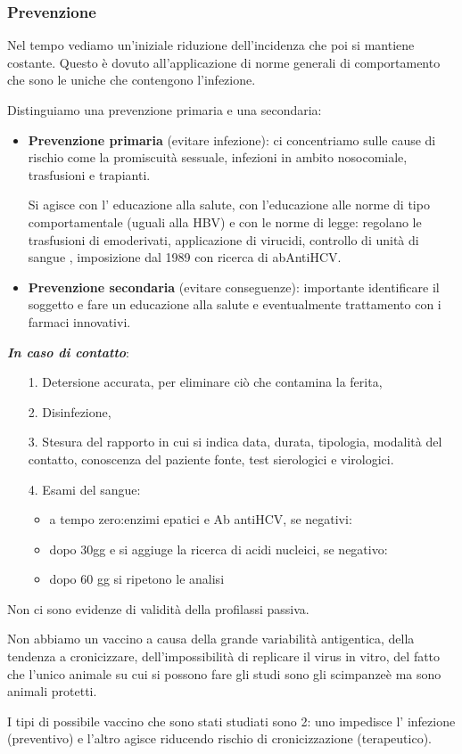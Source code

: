 \subsubsection{Prevenzione}

  Nel tempo vediamo un'iniziale riduzione dell'incidenza che poi si
  mantiene costante. Questo è dovuto all'applicazione di norme generali
  di comportamento che sono le uniche che contengono l'infezione.

  Distinguiamo una prevenzione primaria e una secondaria:

\begin{itemize}
\item
  \textbf{Prevenzione primaria} (evitare infezione): ci concentriamo
  sulle cause di rischio come la promiscuità sessuale, infezioni in
  ambito nosocomiale, trasfusioni e trapianti.

  Si agisce con l' educazione alla salute, con l'educazione alle norme
  di tipo comportamentale (uguali alla HBV) e con le norme di legge:
  regolano le trasfusioni di emoderivati, applicazione di virucidi,
  controllo di unità di sangue , imposizione dal 1989 con ricerca di
  abAntiHCV.
\item
  \textbf{Prevenzione secondaria} (evitare conseguenze): importante
  identificare il soggetto e fare un educazione alla salute e
  eventualmente trattamento con i farmaci innovativi.
\end{itemize}
  
\textbf{\emph{In caso di contatto}}:

\begin{itemize}
\item[1.]
  Detersione accurata, per eliminare ciò che contamina la ferita,
\item[2.]
  Disinfezione,
\item[3.]
  Stesura del rapporto in cui si indica data, durata, tipologia,
  modalità del contatto, conoscenza del paziente fonte, test sierologici
  e virologici.
\item[4.]
  Esami del sangue:
\begin{itemize}
\item
  a tempo zero:enzimi epatici e Ab antiHCV, se negativi:
\item
  dopo 30gg e si aggiuge la ricerca di acidi nucleici, se negativo:
\item
  dopo 60 gg si ripetono le analisi
\end{itemize}
\end{itemize}
  
  Non ci sono evidenze di validità della profilassi passiva.

  Non abbiamo un vaccino a causa della grande variabilità antigentica,
  della tendenza a cronicizzare, dell'impossibilità di replicare il virus
  in vitro, del fatto che l'unico animale su cui si possono fare gli
  studi sono gli scimpanzeè ma sono animali protetti.

  I tipi di possibile vaccino che sono stati studiati sono 2: uno
  impedisce l' infezione (preventivo) e l'altro agisce riducendo rischio
  di cronicizzazione (terapeutico).
